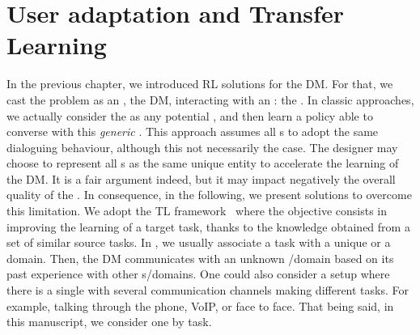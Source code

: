 \chapter{User adaptation and Transfer Learning}
\label{chapter:dm-tl}

In the previous chapter, we introduced \acrfull{RL} solutions for the \acrfull{DM}. For that, we cast the problem as an , the \gls{DM}, interacting with an : the .
In classic approaches, we actually consider the  as any potential , and then learn a policy able to converse with this \textit{generic} . This approach assumes all s to adopt the same dialoguing behaviour, although this not necessarily the case.
%
The designer may choose to represent all s as the same unique entity to accelerate the learning of the \gls{DM}. It is a fair argument indeed, but it may impact negatively the overall quality of the . In consequence, in the following, we present solutions to overcome this limitation. We adopt the \acrfull{TL} framework~\parencite{LazaricSurvey,taylor2009transfer} where the objective consists in improving the learning of a target task, thanks to the knowledge obtained from a set of similar source tasks. In , we usually associate a task with a unique  or a domain. Then, the \gls{DM} communicates with an unknown /domain based on its past experience with other s/domains. One could also consider a setup where there is a single  with several communication channels making different tasks. For example, talking through the phone, VoIP, or face to face. That being said, in this manuscript, we consider one  by task.

